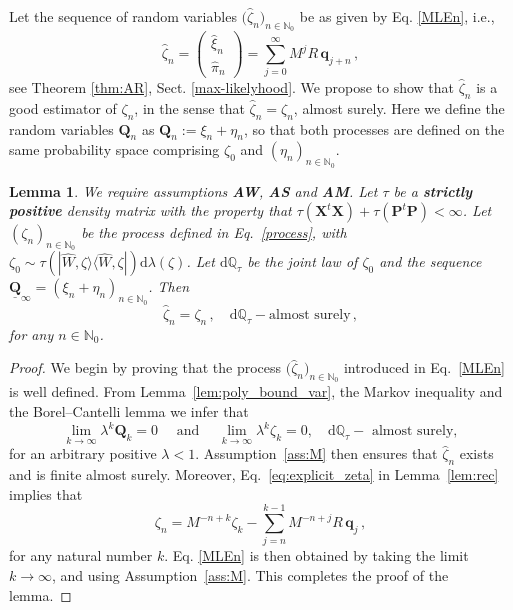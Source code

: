 \documentclass[11pt]{article}
\newtheorem{lemma}[theorem]{Lemma}
\newcommand{\ket}[1]{|{#1}\rangle}
\newcommand{\bra}[1]{\langle{#1}|}
\renewcommand{\d}{{\mathrm d}}
\begin{document}
Let the sequence of random variables $\big(\widehat{\zeta}_n\big)_{n\in \mathbb{N}_0}$ be as given by Eq. \eqref{MLEn}, i.e., 
$$\widehat{\zeta}_n = \left( \begin{array}{c}
\widehat{\xi}_n \\
\widehat{\pi}_n
\end{array}
\right) = \sum_{j=0}^\infty M^{j} R\, \mathbf q_{j+n}\,,$$
see Theorem \ref{thm:AR}, Sect. \ref{max-likelyhood}.
We propose to show that $\widehat \zeta_n$ is a good estimator of $\zeta_n$, in the sense that $\widehat{\zeta}_n=\zeta_n$, almost surely. Here we define the random variables $\mathbf Q_n$ as  $\mathbf Q_n:=\xi_n+\eta_n$, so that both processes are defined on the same probability space comprising $\zeta_0$  and $(\eta_n)_{n\in\mathbb N_0}$.
\begin{lemma}\label{lem:equality_estimator}
	We require assumptions  {\bf{AW}}, {\bf{AS}} and {\bf{AM}}. Let $\tau$ be a {\bf{strictly positive}} density matrix with the property that 
	 $\tau(\mathbf X^t\mathbf X)+\tau(\mathbf P^t\mathbf P)<\infty$. Let $(\zeta_n)_{n\in\mathbb N_0}$ be the process defined in Eq.~\eqref{process}, with $\zeta_0\sim \tau(\ket{\widehat W,\zeta}\bra{\widehat W,\zeta})\d\lambda(\zeta)$. Let 
	 $\d\mathbb Q_\tau$ be the joint law of $\zeta_0$ and the sequence $\underline{\mathbf{Q}}_{\infty}=(\xi_n+ \eta_n)_{n\in\mathbb N_0}$.
	 Then
	$$\widehat{\zeta}_n= \zeta_n\,, \quad \d\mathbb{Q}_{\tau}-\text{almost surely}\,,$$
	for any $n \in \mathbb N_0$.

	\end{lemma}

\begin{proof}
	We begin by proving that the process $\big(\widehat \zeta_n \big)_{n \in \mathbb{N}_0}$ introduced in Eq.~\eqref{MLEn} is well defined. From Lemma~\ref{lem:poly_bound_var}, the Markov inequality and the Borel--Cantelli lemma we infer that 
		$$\lim_{k\to\infty}\lambda^k\mathbf Q_k=0\quad\mbox{ and }\quad \lim_{k\to\infty}\lambda^k\zeta_k=0,\quad \d\mathbb Q_{\tau}-\text{ almost surely},$$
		for an arbitrary positive $\lambda<1$.
Assumption~\ref{ass:M} then ensures that $\widehat \zeta_n$ exists and is finite almost surely.
	Moreover, Eq.~\eqref{eq:explicit_zeta} in Lemma~\ref{lem:rec} implies that
	$$\zeta_n=M^{-n+k}\zeta_{k} - \sum_{j=n}^{k-1}M^{-n+j}R\,\mathbf q_{j}\,,$$
	for any natural number $k$.
	Eq. \eqref{MLEn} is then obtained by taking the limit $k\to\infty$, and using Assumption~\ref{ass:M}. This completes the proof of the lemma.
\end{proof}
\end{document}
